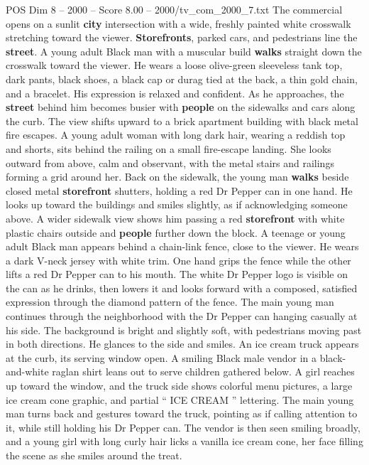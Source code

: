 \begin{textsample}{POS Dim 8 – 2000 – Score 8.00 – 2000/tv\_com\_2000\_7.txt}  \label{ex:f8_pos_011}
The commercial opens on a sunlit \textbf{city} intersection with a wide, freshly painted white crosswalk stretching toward the viewer. \textbf{Storefronts}, parked cars, and pedestrians line the \textbf{street}.
A young adult Black man with a muscular build \textbf{walks} straight down the crosswalk toward the viewer.
He wears a loose olive-green sleeveless tank top, dark pants, black shoes, a black cap or durag tied at the back, a thin gold chain, and a bracelet.
His expression is relaxed and confident.
As he approaches, the \textbf{street} behind him becomes busier with \textbf{people} on the sidewalks and cars along the curb.
The view shifts upward to a brick apartment building with black metal fire escapes.
A young adult woman with long dark hair, wearing a reddish top and shorts, sits behind the railing on a small fire-escape landing.
She looks outward from above, calm and observant, with the metal stairs and railings forming a grid around her.
Back on the sidewalk, the young man \textbf{walks} beside closed metal \textbf{storefront} shutters, holding a red Dr Pepper can in one hand.
He looks up toward the buildings and smiles slightly, as if acknowledging someone above.
A wider sidewalk view shows him passing a red \textbf{storefront} with white plastic chairs outside and \textbf{people} further down the block.
A teenage or young adult Black man appears behind a chain-link fence, close to the viewer.
He wears a dark V-neck jersey with white trim.
One hand grips the fence while the other lifts a red Dr Pepper can to his mouth.
The white Dr Pepper logo is visible on the can as he drinks, then lowers it and looks forward with a composed, satisfied expression through the diamond pattern of the fence.
The main young man continues through the neighborhood with the Dr Pepper can hanging casually at his side.
The background is bright and slightly soft, with pedestrians moving past in both directions.
He glances to the side and smiles.
An ice cream truck appears at the curb, its serving window open.
A smiling Black male vendor in a black-and-white raglan shirt leans out to serve children gathered below.
A girl reaches up toward the window, and the truck side shows colorful menu pictures, a large ice cream cone graphic, and partial “ ICE CREAM ” lettering.
The main young man turns back and gestures toward the truck, pointing as if calling attention to it, while still holding his Dr Pepper can.
The vendor is then seen smiling broadly, and a young girl with long curly hair licks a vanilla ice cream cone, her face filling the scene as she smiles around the treat.

\end{textsample}
